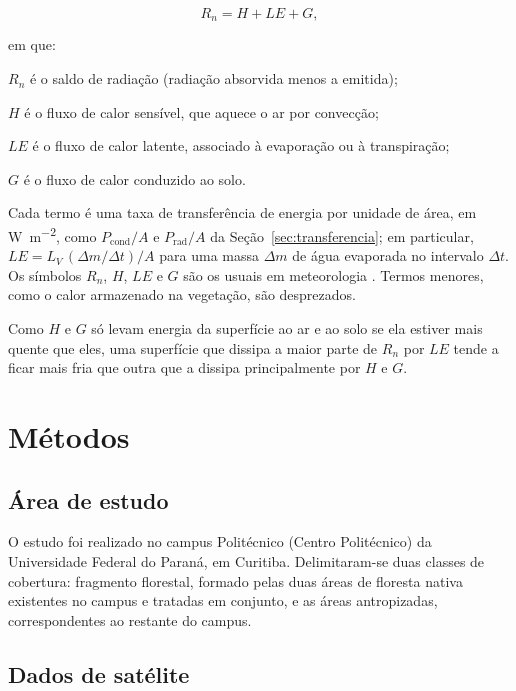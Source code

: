 \documentclass[
12pt,			%
openany,		%
oneside,		%
a4paper,		%
sumario=tradicional,
chapter=TITLE,
section=TITLE,
subsection=Title,
brazil,			%
]{abntex2}
\begin{document}
		
	\begin{equation}
		R_n = H + LE + G, \label{eq:balanco}
	\end{equation}
	
	\noindent em que:
	\begin{alineas}
		\item $R_n$ é o saldo de radiação (radiação absorvida menos a emitida);
		\item $H$ é o fluxo de calor sensível, que aquece o ar por convecção;
		\item $LE$ é o fluxo de calor latente, associado à evaporação ou à transpiração;
		\item $G$ é o fluxo de calor conduzido ao solo.
	\end{alineas}
	
	Cada termo é uma taxa de transferência de energia por unidade de área, em \si{\watt\per\metre\squared}, como $P_{\mathrm{cond}}/A$ e $P_{\mathrm{rad}}/A$ da Seção~\ref{sec:transferencia}; em particular, $LE = L_V \, (\Delta m/\Delta t)/A$ para uma massa $\Delta m$ de água evaporada no intervalo $\Delta t$. Os símbolos $R_n$, $H$, $LE$ e $G$ são os usuais em meteorologia \cite{atmos}. Termos menores, como o calor armazenado na vegetação, são desprezados.
	
	Como $H$ e $G$ só levam energia da superfície ao ar e ao solo se ela estiver mais quente que eles, uma superfície que dissipa a maior parte de $R_n$ por $LE$ tende a ficar mais fria que outra que a dissipa principalmente por $H$ e $G$.
	
	\chapter{Métodos}
	
	\section{Área de estudo}
	
	O estudo foi realizado no campus Politécnico (Centro Politécnico) da Universidade Federal do Paraná, em Curitiba. Delimitaram-se duas classes de cobertura: fragmento florestal, formado pelas duas áreas de floresta nativa existentes no campus e tratadas em conjunto, e as áreas antropizadas, correspondentes ao restante do campus.
	
	\section{Dados de satélite}
	
\end{document}

